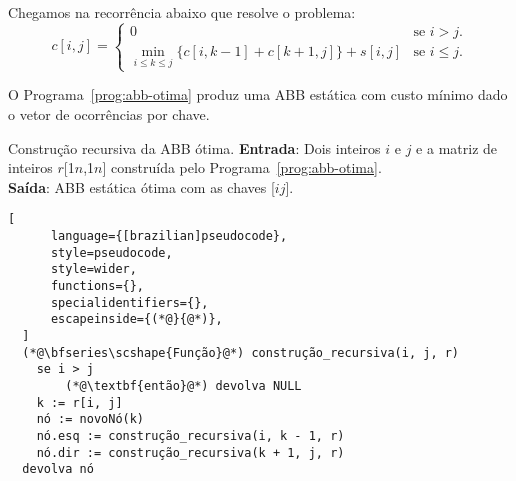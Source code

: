 Chegamos na recorrência abaixo que resolve o problema:
\[
c[i, j] = 
\begin{cases}
    0 & \text{se } i > j. \\
    \min_{i \leq k \leq j} \{ c[i, k - 1] + c[k + 1, j]\} + s[i, j] & \text{se } i \leq j.
\end{cases}
\]

O Programa~\ref{prog:abb-otima} produz uma ABB estática com custo mínimo dado o vetor de ocorrências por chave.

\begin{programruledcaption}{Construção recursiva da ABB ótima.\label{prog:abb-construcao}}
  \noindent\textbf{Entrada}: Dois inteiros $i$ e $j$ e a matriz de inteiros $r$[1\tdots$n$,1\tdots$n$] construída pelo Programa~\ref{prog:abb-otima}. \\
  \textbf{Saída}: ABB estática ótima com as chaves [$i$\tdots$j$].
  \vspace{-0.5\baselineskip}
  \begin{lstlisting}[
      language={[brazilian]pseudocode},
      style=pseudocode,
      style=wider,
      functions={},
      specialidentifiers={},
      escapeinside={(*@}{@*)},
  ]
  (*@\bfseries\scshape{Função}@*) construção_recursiva(i, j, r)
    se i > j
        (*@\textbf{então}@*) devolva NULL
    k := r[i, j]
    nó := novoNó(k)
    nó.esq := construção_recursiva(i, k - 1, r)
    nó.dir := construção_recursiva(k + 1, j, r)
  devolva nó
  \end{lstlisting}
  \vspace{-0.5\baselineskip}
\end{programruledcaption}

